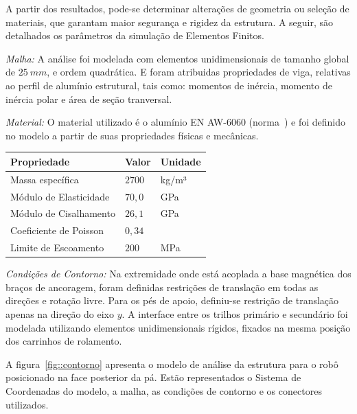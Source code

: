 A partir dos resultados, pode-se determinar alterações de geometria ou seleção
de materiais, que garantam maior segurança e rigidez da estrutura.
A seguir, são detalhados os parâmetros da simulação de Elementos Finitos.

\textit{Malha:} A análise foi modelada com elementos unidimensionais
de tamanho global de $25~mm$, e ordem quadrática.  E foram atribuidas propriedades
de viga, relativas ao perfil de alumínio estrutural, tais como:
momentos de inércia, momento de inércia polar e área de seção tranversal.

\textit{Material:} O material utilizado é o alumínio EN AW-6060
(norma~\cite{DIN_2007}) e foi definido no modelo a partir de suas propriedades físicas e mecânicas.

\begin{center}
\centering
\begin{tabular}{|l|l|l|}
\hline
\textbf{Propriedade}   & \textbf{Valor}   & \textbf{Unidade}  \\ \hline
Massa específica       & $2700$           & kg/m³             \\ \hline
Módulo de Elasticidade & $70,0$           & GPa               \\ \hline
Módulo de Cisalhamento & $26,1$           & GPa               \\ \hline
Coeficiente de Poisson & $0,34$           &                   \\ \hline
Limite de Escoamento   & $200$            & MPa               \\ \hline
\end{tabular}
\label{tab::prop_material}
\end{center}


\textit{Condições de Contorno:} Na extremidade onde está acoplada a base
magnética dos braços de ancoragem, foram definidas restrições de translação
em todas as direções e rotação livre. Para os pés de apoio, definiu-se restrição
de translação apenas na direção do eixo $y$. A interface entre os trilhos
primário e secundário foi modelada utilizando elementos unidimensionais rígidos, fixados na
mesma posição dos carrinhos de rolamento.

A figura~\ref{fig::contorno} apresenta o modelo de análise da estrutura para o
robô posicionado na face posterior da pá. Estão representados o Sistema de
Coordenadas do modelo, a malha, as condições de contorno e os conectores
utilizados.

